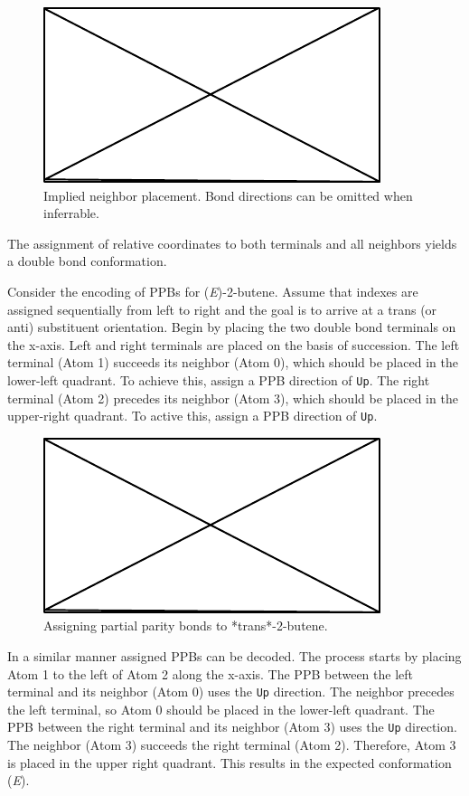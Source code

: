 \documentclass{article}
\def\ttt{\texttt}
\begin{document}
\begin{figure}
    \centering
    \includegraphics{filler}
    \caption{Implied neighbor placement. Bond directions can be omitted when inferrable.}
    \label{fig:implied-neighbor-placement}
\end{figure}

The assignment of relative coordinates to both terminals and all neighbors yields a double bond conformation.

Consider the encoding of PPBs for (\textit{E})-2-butene. Assume that indexes are assigned sequentially from left to right and the goal is to arrive at a trans (or anti) substituent orientation. Begin by placing the two double bond terminals on the x-axis. Left and right terminals are placed on the basis of succession. The left terminal (Atom 1) succeeds its neighbor (Atom 0), which should be placed in the lower-left quadrant. To achieve this, assign a PPB direction of \ttt{Up}. The right terminal (Atom 2) precedes its neighbor (Atom 3), which should be placed in the upper-right quadrant. To active this, assign a PPB direction of \ttt{Up}.

\begin{figure}
    \centering
    \includegraphics{filler}
    \caption{Assigning partial parity bonds to *trans*-2-butene.}
    \label{fig:assigning-ppb}
\end{figure}

In a similar manner assigned PPBs can be decoded. The process starts by placing Atom 1 to the left of Atom 2 along the x-axis. The PPB between the left terminal and its neighbor (Atom 0) uses the \ttt{Up} direction. The neighbor precedes the left terminal, so Atom 0 should be placed in the lower-left quadrant. The PPB between the right terminal and its neighbor (Atom 3) uses the \ttt{Up} direction. The neighbor (Atom 3) succeeds the right terminal (Atom 2). Therefore, Atom 3 is placed in the upper right quadrant. This results in the expected conformation (\textit{E}).
\end{document}
